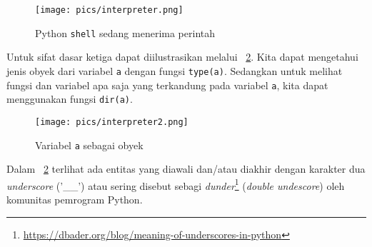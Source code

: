 \begin{figure}[h!]
  \begin{center}
    \texttt{[image: pics/interpreter.png]}
    \caption{Python \texttt{shell} sedang menerima perintah}
    \label{fig:interpreter}
  \end{center}
\end{figure}

Untuk sifat dasar ketiga dapat diilustrasikan melalui \figurename~\ref{fig:obyek}. Kita dapat mengetahui jenis obyek dari variabel \texttt{a} dengan fungsi \texttt{type(a)}. Sedangkan untuk melihat fungsi dan variabel apa saja yang terkandung pada variabel \texttt{a}, kita dapat menggunakan fungsi \texttt{dir(a)}.

\begin{figure}[h!]
  \begin{center}
    \texttt{[image: pics/interpreter2.png]}
    \caption{Variabel \texttt{a} sebagai obyek}
    \label{fig:obyek}
  \end{center}
\end{figure}

Dalam \figurename~\ref{fig:obyek} terlihat ada entitas yang diawali dan/atau diakhir dengan karakter dua \textit{underscore} ('\_\_') atau sering disebut sebagi \textit{dunder}\footnote{\url{https://dbader.org/blog/meaning-of-underscores-in-python}} (\textit{double undescore}) oleh komunitas pemrogram Python.
